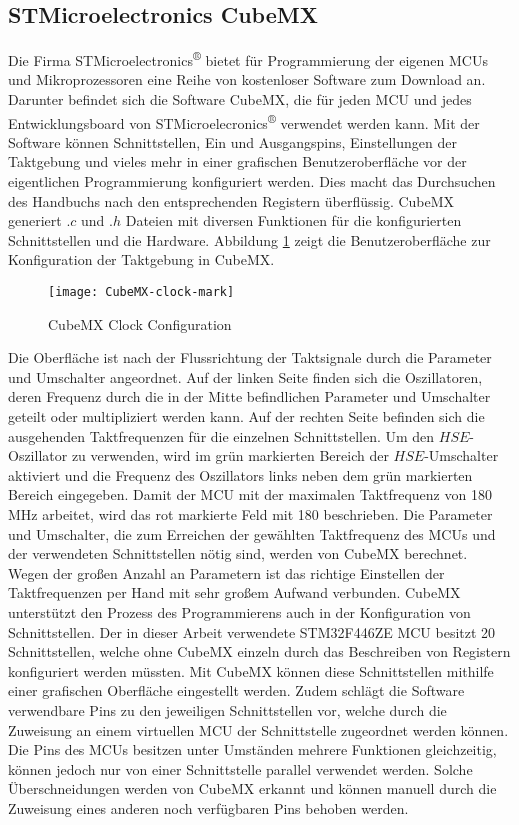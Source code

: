 
\subsection{STMicroelectronics CubeMX}
Die Firma STMicroelectronics\textsuperscript{®} bietet für Programmierung der eigenen MCUs und Mikroprozessoren eine Reihe von kostenloser Software zum Download an. Darunter befindet sich die Software CubeMX, die für jeden MCU und jedes Entwicklungsboard von STMicroelecronics\textsuperscript{®} verwendet werden kann. Mit der Software können Schnittstellen, Ein und Ausgangspins, Einstellungen der Taktgebung und vieles mehr in einer grafischen Benutzeroberfläche vor der eigentlichen Programmierung konfiguriert werden. Dies macht das Durchsuchen des Handbuchs nach den entsprechenden Registern überflüssig. CubeMX generiert $.c$ und $.h$ Dateien mit diversen Funktionen für die konfigurierten Schnittstellen und die Hardware. 
Abbildung \ref{fig:CubeMXClock} zeigt die Benutzeroberfläche zur Konfiguration der Taktgebung in CubeMX. 
\begin{figure}[h]
	\centering
	\texttt{[image: CubeMX-clock-mark]}
	\caption{CubeMX Clock Configuration}
	\label{fig:CubeMXClock}
\end{figure}
Die Oberfläche ist nach der Flussrichtung der Taktsignale durch die Parameter und Umschalter angeordnet. Auf der linken Seite finden sich die Oszillatoren, deren Frequenz durch die in der Mitte befindlichen Parameter und Umschalter geteilt oder multipliziert werden kann. Auf der rechten Seite befinden sich die ausgehenden Taktfrequenzen für die einzelnen Schnittstellen. Um den $HSE$-Oszillator zu verwenden, wird im grün markierten Bereich der $HSE$-Umschalter aktiviert und die Frequenz des Oszillators links neben dem grün markierten Bereich eingegeben. Damit der MCU mit der maximalen Taktfrequenz von 180\,MHz arbeitet, wird das rot markierte Feld mit 180 beschrieben. Die Parameter und Umschalter, die zum Erreichen der gewählten Taktfrequenz des MCUs und der verwendeten Schnittstellen nötig sind, werden von CubeMX berechnet. Wegen der großen Anzahl an Parametern ist das richtige Einstellen der Taktfrequenzen per Hand mit sehr großem Aufwand verbunden. CubeMX unterstützt den Prozess des Programmierens auch in der Konfiguration von Schnittstellen. Der in dieser Arbeit verwendete STM32F446ZE MCU besitzt 20 Schnittstellen, welche ohne CubeMX einzeln durch das Beschreiben von Registern konfiguriert werden müssten. Mit CubeMX können diese Schnittstellen mithilfe einer grafischen Oberfläche eingestellt werden. Zudem schlägt die Software verwendbare Pins zu den jeweiligen Schnittstellen vor, welche durch die Zuweisung an einem virtuellen MCU der Schnittstelle zugeordnet werden können. Die Pins des MCUs besitzen unter Umständen mehrere Funktionen gleichzeitig, können jedoch nur von einer Schnittstelle parallel verwendet werden. Solche Überschneidungen werden von CubeMX erkannt und können manuell durch die Zuweisung eines anderen noch verfügbaren Pins behoben werden.
